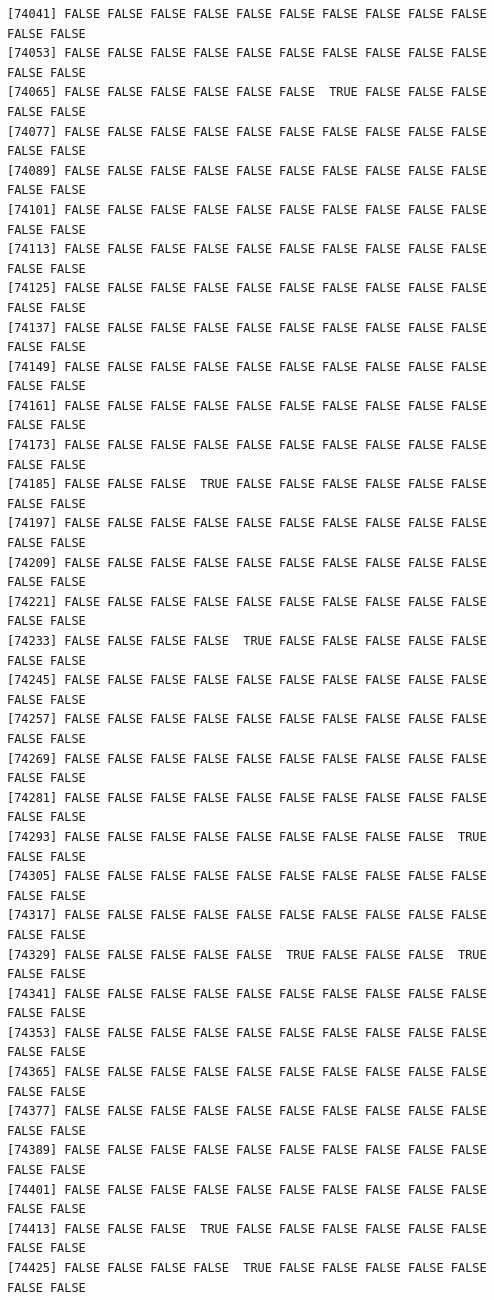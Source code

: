 \documentclass[
  a4paper,
  DIV=11,
  numbers=noendperiod]{scrartcl}
\begin{document}
\begin{verbatim}
[74041] FALSE FALSE FALSE FALSE FALSE FALSE FALSE FALSE FALSE FALSE FALSE FALSE
[74053] FALSE FALSE FALSE FALSE FALSE FALSE FALSE FALSE FALSE FALSE FALSE FALSE
[74065] FALSE FALSE FALSE FALSE FALSE FALSE  TRUE FALSE FALSE FALSE FALSE FALSE
[74077] FALSE FALSE FALSE FALSE FALSE FALSE FALSE FALSE FALSE FALSE FALSE FALSE
[74089] FALSE FALSE FALSE FALSE FALSE FALSE FALSE FALSE FALSE FALSE FALSE FALSE
[74101] FALSE FALSE FALSE FALSE FALSE FALSE FALSE FALSE FALSE FALSE FALSE FALSE
[74113] FALSE FALSE FALSE FALSE FALSE FALSE FALSE FALSE FALSE FALSE FALSE FALSE
[74125] FALSE FALSE FALSE FALSE FALSE FALSE FALSE FALSE FALSE FALSE FALSE FALSE
[74137] FALSE FALSE FALSE FALSE FALSE FALSE FALSE FALSE FALSE FALSE FALSE FALSE
[74149] FALSE FALSE FALSE FALSE FALSE FALSE FALSE FALSE FALSE FALSE FALSE FALSE
[74161] FALSE FALSE FALSE FALSE FALSE FALSE FALSE FALSE FALSE FALSE FALSE FALSE
[74173] FALSE FALSE FALSE FALSE FALSE FALSE FALSE FALSE FALSE FALSE FALSE FALSE
[74185] FALSE FALSE FALSE  TRUE FALSE FALSE FALSE FALSE FALSE FALSE FALSE FALSE
[74197] FALSE FALSE FALSE FALSE FALSE FALSE FALSE FALSE FALSE FALSE FALSE FALSE
[74209] FALSE FALSE FALSE FALSE FALSE FALSE FALSE FALSE FALSE FALSE FALSE FALSE
[74221] FALSE FALSE FALSE FALSE FALSE FALSE FALSE FALSE FALSE FALSE FALSE FALSE
[74233] FALSE FALSE FALSE FALSE  TRUE FALSE FALSE FALSE FALSE FALSE FALSE FALSE
[74245] FALSE FALSE FALSE FALSE FALSE FALSE FALSE FALSE FALSE FALSE FALSE FALSE
[74257] FALSE FALSE FALSE FALSE FALSE FALSE FALSE FALSE FALSE FALSE FALSE FALSE
[74269] FALSE FALSE FALSE FALSE FALSE FALSE FALSE FALSE FALSE FALSE FALSE FALSE
[74281] FALSE FALSE FALSE FALSE FALSE FALSE FALSE FALSE FALSE FALSE FALSE FALSE
[74293] FALSE FALSE FALSE FALSE FALSE FALSE FALSE FALSE FALSE  TRUE FALSE FALSE
[74305] FALSE FALSE FALSE FALSE FALSE FALSE FALSE FALSE FALSE FALSE FALSE FALSE
[74317] FALSE FALSE FALSE FALSE FALSE FALSE FALSE FALSE FALSE FALSE FALSE FALSE
[74329] FALSE FALSE FALSE FALSE FALSE  TRUE FALSE FALSE FALSE  TRUE FALSE FALSE
[74341] FALSE FALSE FALSE FALSE FALSE FALSE FALSE FALSE FALSE FALSE FALSE FALSE
[74353] FALSE FALSE FALSE FALSE FALSE FALSE FALSE FALSE FALSE FALSE FALSE FALSE
[74365] FALSE FALSE FALSE FALSE FALSE FALSE FALSE FALSE FALSE FALSE FALSE FALSE
[74377] FALSE FALSE FALSE FALSE FALSE FALSE FALSE FALSE FALSE FALSE FALSE FALSE
[74389] FALSE FALSE FALSE FALSE FALSE FALSE FALSE FALSE FALSE FALSE FALSE FALSE
[74401] FALSE FALSE FALSE FALSE FALSE FALSE FALSE FALSE FALSE FALSE FALSE FALSE
[74413] FALSE FALSE FALSE  TRUE FALSE FALSE FALSE FALSE FALSE FALSE FALSE FALSE
[74425] FALSE FALSE FALSE FALSE  TRUE FALSE FALSE FALSE FALSE FALSE FALSE FALSE

\end{verbatim}
\end{document}
